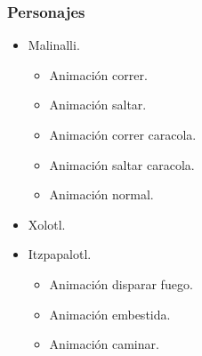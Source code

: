 \documentclass[11pt,letterpaper]{article}
\begin{document}
\begin{itemize}
        \subsubsection{Personajes}
        \begin{itemize}
                \item Malinalli. 
                \begin{itemize}
                        \item Animación correr.
                        \item Animación saltar.
                        \item Animación correr caracola.
                        \item Animación saltar caracola.
                        \item Animación normal.
                \end{itemize}
                \item Xolotl.
                \item Itzpapalotl.
                \begin{itemize}
                        \item Animación disparar fuego.
                        \item Animación embestida.
                        \item Animación caminar.
                \end{itemize}
        \end{itemize}

\end{itemize}
\end{document}
